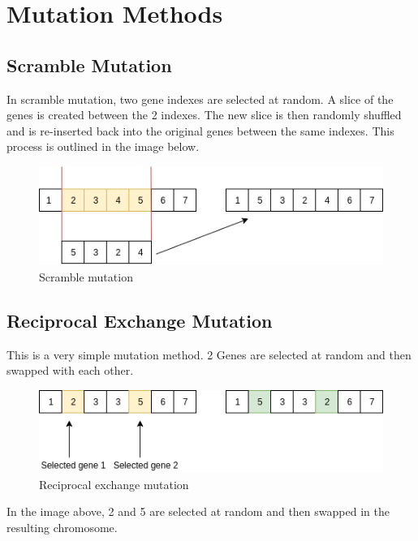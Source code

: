 \section{Mutation Methods}

\subsection{Scramble Mutation}

In scramble mutation, two gene indexes are selected at random. A slice of the genes is created between the 2 indexes. The new slice is then randomly shuffled and is re-inserted back into the original genes between the same indexes. This process is outlined in the image below.

\begin{figure}[h!]
\vspace{-5pt}
\centering
\includegraphics[width=1.0\textwidth]{images/scramble.png}
\caption{\label{fig:3col_graph}Scramble mutation}
\end{figure}

\subsection{Reciprocal Exchange Mutation}

This is a very simple mutation method. 2 Genes are selected at random and then swapped with each other.

\begin{figure}[h!]
\vspace{-5pt}
\centering
\includegraphics[width=1.0\textwidth]{images/reciprocal.png}
\caption{\label{fig:3col_graph}Reciprocal exchange mutation}
\end{figure}

In the image above, 2 and 5 are selected at random and then swapped in the resulting chromosome.